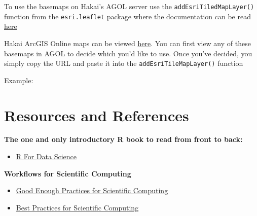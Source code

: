 \documentclass[]{book}
\newenvironment{Shaded}{\begin{snugshade}}{\end{snugshade}}
\newcommand{\KeywordTok}[1]{\textcolor[rgb]{0.13,0.29,0.53}{\textbf{#1}}}
\newcommand{\CommentTok}[1]{\textcolor[rgb]{0.56,0.35,0.01}{\textit{#1}}}
\newcommand{\NormalTok}[1]{#1}
\providecommand{\tightlist}{%
  \setlength{\itemsep}{0pt}\setlength{\parskip}{0pt}}
\begin{document}
To use the basemaps on Hakai's AGOL server use the
\texttt{addEsriTiledMapLayer()} function from the \texttt{esri.leaflet}
package where the documentation can be read
\href{https://bhaskarvk.github.io/leaflet.esri/reference/addEsriTiledMapLayer.html}{here}

Hakai ArcGIS Online maps can be viewed
\href{https://ags.hakai.org:6443/arcgis/rest/services/AGOL_basemaps/}{here}.
You can first view any of these basemaps in AGOL to decide which you'd
like to use. Once you've decided, you simply copy the URL and paste it
into the \texttt{addEsriTileMapLayer()} function

Example:

\begin{Shaded}
\end{Shaded}

\chapter{Resources and References}\label{resources-and-references}

\textbf{The one and only introductory R book to read from front to
back:}

\begin{itemize}
\tightlist
\item
  \href{http://r4ds.had.co.nz/}{R For Data Science}
\end{itemize}

\textbf{Workflows for Scientific Computing}

\begin{itemize}
\tightlist
\item
  \href{http://journals.plos.org/ploscompbiol/article?id=10.1371/journal.pcbi.1005510}{Good
  Enough Practices for Scientific Computing}
\item
  \href{http://journals.plos.org/plosbiology/article?id=10.1371/journal.pbio.1001745}{Best
  Practices for Scientific Computing}
\end{itemize}
\end{document}
